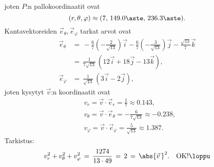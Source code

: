 joten $P$:n pallokoordinaatit ovat
\[
(r,\theta,\varphi) \approx (7,\,149.0\aste,\,236.3\aste).
\]
Kantavektoreiden $\vec e_\theta,\vec e_\varphi$ tarkat arvot ovat
\begin{align*}
\vec e_\theta  &=\,-\frac{6}{7}\left(-\frac{2}{\sqrt{13}}\right)\vec i
                  -\frac{6}{7}\left(-\frac{3}{\sqrt{13}}\right)\vec j
                  -\frac{\sqrt{13}}{7}\vec k \\
               &=\,\frac{1}{7\sqrt{13}}\,(12\vec i+18\vec j-13\vec k), \\
\vec e_\varphi &=\,\frac{1}{\sqrt{13}}\,(3\vec i-2\vec j),
\end{align*}
joten kysytyt $\vec v$:n koordinaatit ovat
\begin{align*}
&v_r       = \vec v\cdot\vec e_r       =  \frac{1}{7}          \approx  0.143, \\
&v_\theta  = \vec v\cdot\vec e_\theta  = -\frac{6}{7\sqrt{13}} \approx -0.238, \\
&v_\varphi = \vec v\cdot\vec e_\varphi =  \frac{5}{\sqrt{13}}  \approx  1.387.
\end{align*}
Tarkistus:
\[
v_r^2+v_\theta^2+v_\varphi^2\,=\,\frac{1274}{13 \cdot 49}\,
                              =\,2\,=\,\abs{\vec v\,}^2. \quad\text{OK!} \loppu
\]

